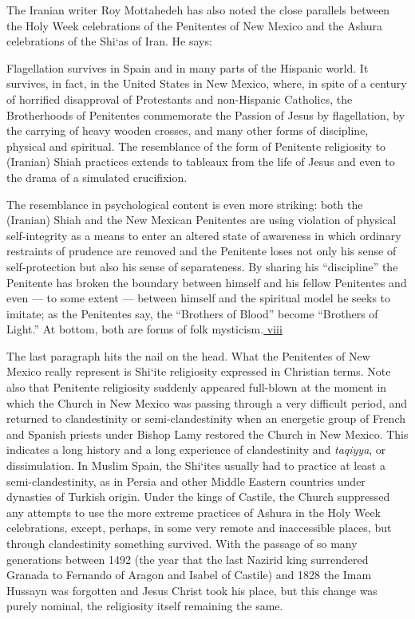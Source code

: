 The Iranian writer Roy Mottahedeh has also noted the close parallels between the Holy Week celebrations of the Penitentes of New Mexico and the Ashura celebrations of the Shi`as of Iran. He says:

Flagellation survives in Spain and in many parts of the Hispanic world. It survives, in fact, in the United States in New Mexico, where, in spite of a century of horrified disapproval of Protestants and non-Hispanic Catholics, the Brotherhoods of Penitentes commemorate the Passion of Jesus by flagellation, by the carrying of heavy wooden crosses, and many other forms of discipline, physical and spiritual. The resemblance of the form of Penitente religiosity to (Iranian) Shiah practices extends to tableaux from the life of Jesus and even to the drama of a simulated crucifixion.

The resemblance in psychological content is even more striking: both the (Iranian) Shiah and the New Mexican Penitentes are using violation of physical self-integrity as a means to enter an altered state of awareness in which ordinary restraints of prudence are removed and the Penitente loses not only his sense of self-protection but also his sense of separateness. By sharing his ``discipline'' the Penitente has broken the boundary between himself and his fellow Penitentes and even --- to some extent --- between himself and the spiritual model he seeks to imitate; as the Penitentes say, the ``Brothers of Blood'' become ``Brothers of Light.'' At bottom, both are forms of folk mysticism.\hyperref[_edn8]{ viii }

The last paragraph hits the nail on the head. What the Penitentes of New Mexico really represent is Shi`ite religiosity expressed in Christian terms. Note also that Penitente religiosity suddenly appeared full-blown at the moment in which the Church in New Mexico was passing through a very difficult period, and returned to clandestinity or semi-clandestinity when an energetic group of French and Spanish priests under Bishop Lamy restored the Church in New Mexico. This indicates a long history and a long experience of clandestinity and \emph{taqiyya}, or dissimulation. In Muslim Spain, the Shi`ites usually had to practice at least a semi-clandestinity, as in Persia and other Middle Eastern countries under dynasties of Turkish origin. Under the kings of Castile, the Church suppressed any attempts to use the more extreme practices of Ashura in the Holy Week celebrations, except, perhaps, in some very remote and inaccessible places, but through clandestinity something survived. With the passage of so many generations between 1492 (the year that the last Nazirid king surrendered Granada to Fernando of Aragon and Isabel of Castile) and 1828 the Imam Hussayn was forgotten and Jesus Christ took his place, but this change was purely nominal, the religiosity itself remaining the same.

